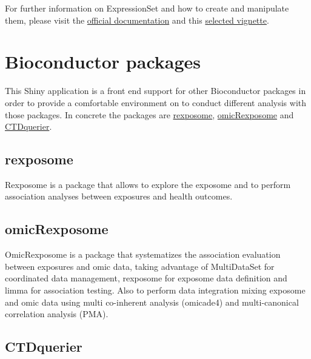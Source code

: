 \documentclass[
]{book}
\begin{document}
For further information on ExpressionSet and how to create and manipulate them, please visit the \href{https://www.bioconductor.org/packages/devel/bioc/vignettes/Biobase/inst/doc/ExpressionSetIntroduction.pdf}{official documentation} and this \href{https://kasperdanielhansen.github.io/genbioconductor/html/ExpressionSet.html}{selected vignette}.

\hypertarget{bioconductor-packages}{%
\chapter{Bioconductor packages}\label{bioconductor-packages}}

This Shiny application is a front end support for other Bioconductor packages in order to provide a comfortable environment on to conduct different analysis with those packages. In concrete the packages are \href{https://www.bioconductor.org/packages/release/bioc/html/rexposome.html}{rexposome}, \href{https://bioconductor.org/packages/release/bioc/html/omicRexposome.html}{omicRexposome} and \href{http://www.bioconductor.org/packages/release/bioc/html/CTDquerier.html}{CTDquerier}.

\hypertarget{rexposome}{%
\section{rexposome}\label{rexposome}}

Rexposome is a package that allows to explore the exposome and to perform association analyses between exposures and health outcomes.

\hypertarget{omicrexposome}{%
\section{omicRexposome}\label{omicrexposome}}

OmicRexposome is a package that systematizes the association evaluation between exposures and omic data, taking advantage of MultiDataSet for coordinated data management, rexposome for exposome data definition and limma for association testing. Also to perform data integration mixing exposome and omic data using multi co-inherent analysis (omicade4) and multi-canonical correlation analysis (PMA).

\hypertarget{ctdquerier}{%
\section{CTDquerier}\label{ctdquerier}}
\end{document}
